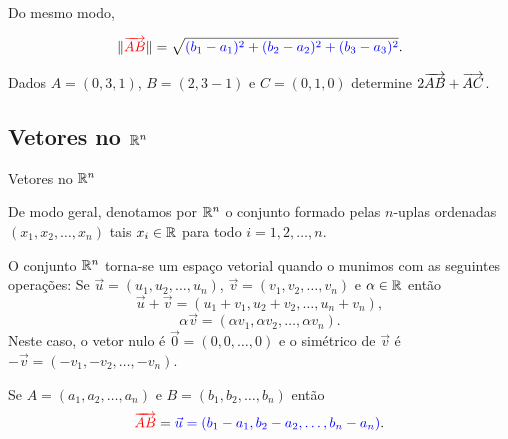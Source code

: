 \begin{frame}[label=vetores]
Do mesmo modo,
\begin{center}
\begin{minipage}{0.7\textwidth}
\begin{block}{}
\[\|{\color{red}\overrightarrow{AB}}\|=\sqrt{{\color{blue}(b_1-a_1)^2+(b_2-a_2)^2 +(b_3-a_3)^2}}.\]
\end{block}
\end{minipage}
\end{center}


\begin{exe}
Dados $A=(0,3,1)$, $B=(2,3-1)$ e $C=(0,1,0)$ determine $2\overrightarrow{AB}+\overrightarrow{AC}$.
\end{exe}


\end{frame}

\subsection*{Vetores no $\mathbb{R}^n$}
\begin{frame}[label=vetores]{Vetores no $\mathbb{R}^n$}

De modo geral, denotamos por   $\mathbb{R}^n$ o conjunto formado pelas {\color{blue} $n$-uplas ordenadas} $(x_1,x_2,\ldots,x_n)$ tais $x_i\in \mathbb{R}$ para todo $i=1,2,\ldots,n$.
\medskip

O conjunto $\mathbb{R}^n$ torna-se um espaço vetorial quando o munimos com as seguintes  operações: Se $\vec{u}=(u_1,u_2,\ldots,u_n)$,  $\vec{v}=(v_1,v_2,\ldots,v_n)$ e $\alpha\in \mathbb{R}$ então
\[\vec{u}+\vec{v}=(u_1+v_1,u_2+v_2,\ldots,u_n+v_n),\]
\[\alpha \vec{v}=(\alpha v_1,\alpha v_2,\ldots,\alpha v_n).\]
Neste caso, o {\color{blue}vetor nulo} é $\vec{0}=(0,0,\ldots,0)$ e o {\color{blue}simétrico} de $\vec{v}$ é  $-\vec{v}=(-v_1,-v_2,\ldots,-v_n)$.

\begin{center}
\begin{minipage}{0.7\textwidth}
\begin{block}{}
Se {\color{red}$A=(a_1,a_2,\ldots,a_n)$} e {\color{red}$B=(b_1,b_2,\ldots,b_n)$} então
\[{\color{red}\overrightarrow{AB}}={\color{blue}\vec{u}=(b_1-a_1,b_2-a_2,\ldots,b_n-a_n)}.\]
\end{block}
\end{minipage}
\end{center}

\end{frame}

